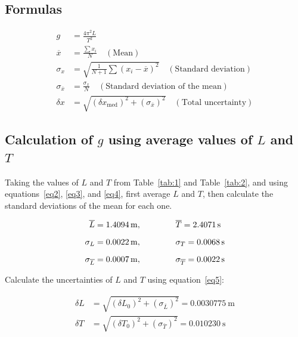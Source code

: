 \documentclass[11pt,a4paper]{article}
\begin{document}
\subsection*{Formulas}

\begin{align}
g
&=
\frac{4\pi^{2}L}{T^{2}}
\label{eq1}
\\[0.2cm]
\overline{x}
&=
\frac{\sum x_i}{N}
\quad (\text{Mean})
\label{eq2}
\\[0.2cm]
\sigma_x
&=
\sqrt{
\frac{1}{N+1}
\sum (x_i-\overline{x})^2
}
\quad (\text{Standard deviation})
\label{eq3}
\\[0.2cm]
\sigma_{\overline{x}}
&=
\frac{\sigma_x}{N}
\quad (\text{Standard deviation of the mean})
\label{eq4}
\\[0.2cm]
\delta x
&=
\sqrt{
(\delta x_{\text{med}})^2
+
(\sigma_{\bar{x}})^2
}
\quad (\text{Total uncertainty})
\label{eq5}
\end{align}

\subsection*{Calculation of $g$ using average values of $L$ and $T$}

Taking the values of $L$ and $T$ from Table~\ref{tab:1} and Table~\ref{tab:2}, and using equations~\eqref{eq2}, \eqref{eq3}, and \eqref{eq4}, first average $L$ and $T$, then calculate the standard deviations of the mean for each one.

\begin{align}
\overline{L}=\qty{1.4094}{\m}, \hspace{1.5cm}
&
\overline{T}=\qty{2.4071}{\s}
\label{eq6}
\\[0.2cm]
\sigma_{L}=\qty{0.0022}{\m}, \hspace{1.5cm}
&
\sigma_{T}=\qty{0.0068}{\s}
\label{eq7}
\\[0.2cm]
\sigma_{\overline{L}}=\qty{0.0007}{\m}, \hspace{1.5cm}
&
\sigma_{\overline{T}}=\qty{0.0022}{\s}
\label{eq8}
\end{align}

Calculate the uncertainties of $L$ and $T$ using equation~\eqref{eq5}:

\begin{align}
\delta L
&=
\sqrt{
(\delta L_0)^2 + (\sigma_{\bar{L}})^2
}
=
\qty{0.0030775}{\m}
\label{eq9}
\\[0.2cm]
\delta T
&=
\sqrt{
(\delta T_0)^2 + (\sigma_{\bar{T}})^2
}
=
\qty{0.010230}{\s}
\label{eq10}
\end{align}
\end{document}
